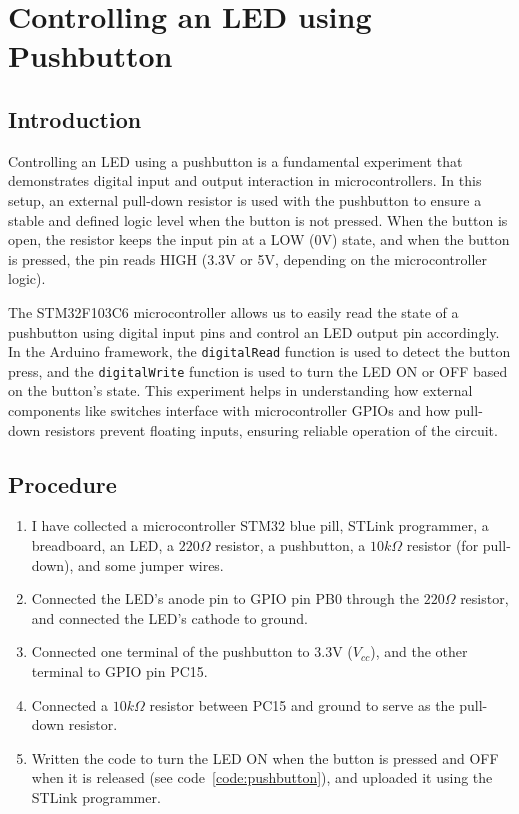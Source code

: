 
\section{Controlling an LED using Pushbutton}
\subsection{Introduction}
Controlling an LED using a pushbutton is a fundamental experiment 
that demonstrates digital input and output
interaction in microcontrollers.
In this setup, an external pull-down resistor
is used with the pushbutton to ensure a stable
and defined logic level when the button is not pressed.
When the button is open, the resistor keeps the input pin
at a LOW (0V) state, and when the button is pressed,
the pin reads HIGH (3.3V or 5V, depending on 
the microcontroller logic).

The STM32F103C6 microcontroller allows us to easily read the state
of a pushbutton using digital input pins and control 
an LED output pin accordingly.
In the Arduino framework, the \texttt{digitalRead}
function is used to detect the button press,
and the \texttt{digitalWrite} function is used to
turn the LED ON or OFF based on the button's state.
This experiment helps in understanding how external
components like switches interface with microcontroller
GPIOs and how pull-down resistors prevent floating inputs,
ensuring reliable operation of the circuit.
\subsection{Procedure}
\begin{enumerate}
  \item I have collected a microcontroller STM32 blue pill, STLink programmer,
    a breadboard, an LED, a $220\Omega$ resistor, a pushbutton, a $10k\Omega$ resistor (for pull-down), and some jumper wires.
  \item Connected the LED's anode pin to GPIO pin PB0 through the $220\Omega$ resistor, 
    and connected the LED's cathode to ground.
  \item Connected one terminal of the pushbutton to 3.3V ($V_{cc}$), and the other terminal to GPIO pin PC15.
  \item Connected a $10k\Omega$ resistor between PC15 and ground to serve as the pull-down resistor.
  \item Written the code to turn the LED ON when the button is pressed and OFF when it is released (see code~\ref{code:pushbutton}), and uploaded it using the STLink programmer.
\end{enumerate}
\newpage
